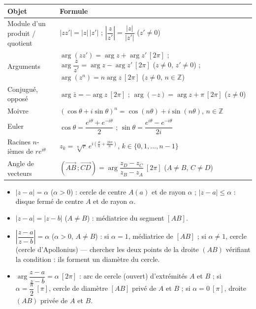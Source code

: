 \documentclass[11pt]{article}
\newcommand{\cle}[1]{{\popxbold\color{popdark}#1}}
\begin{document}
\begin{aretenir}
\begin{center}
\begin{tabularx}{\linewidth}{|l|X|}
\hline
\rowcolor{popblueL} \textbf{Objet} & \textbf{Formule} \\
\hline
Module d'un produit / quotient & $|zz'|=|z|\,|z'|$ ; $\left|\dfrac{z}{z'}\right|=\dfrac{|z|}{|z'|}$ ($z'\neq 0$) \\
\hline
Arguments & $\arg(zz')=\arg z+\arg z'\ [2\pi]$ ; $\arg\dfrac{z}{z'}=\arg z-\arg z'\ [2\pi]$ ($z\neq 0$, $z'\neq 0$) ; $\arg(z^n)=n\arg z\ [2\pi]$ ($z\neq 0$, $n\in\mathbb{Z}$) \\
\hline
Conjugué, opposé & $\arg\bar z=-\arg z\ [2\pi]$ ; $\arg(-z)=\arg z+\pi\ [2\pi]$ ($z\neq 0$) \\
\hline
Moivre & $(\cos\theta+i\sin\theta)^n=\cos(n\theta)+i\sin(n\theta)$, $n\in\mathbb{Z}$ \\
\hline
Euler & $\cos\theta=\dfrac{e^{i\theta}+e^{-i\theta}}{2}$ ; $\sin\theta=\dfrac{e^{i\theta}-e^{-i\theta}}{2i}$ \\
\hline
Racines $n$-ièmes de $re^{i\theta}$ & $z_k=\sqrt[n]{r}\,e^{i\left(\frac{\theta}{n}+\frac{2k\pi}{n}\right)}$, $k\in\{0,1,\dots,n-1\}$ \\
\hline
Angle de vecteurs & $(\overrightarrow{AB}\,;\overrightarrow{CD})=\arg\dfrac{z_D-z_C}{z_B-z_A}\ [2\pi]$ ($A\neq B$, $C\neq D$) \\
\hline
\end{tabularx}
\end{center}
\end{aretenir}

\begin{aretenir}
\begin{itemize}
  \item $|z-a|=\alpha$ ($\alpha>0$) : \cle{cercle} de centre $A(a)$ et de rayon $\alpha$ ; $|z-a|\leq\alpha$ : \cle{disque fermé} de centre $A$ et de rayon $\alpha$.
  \item $|z-a|=|z-b|$ ($A\neq B$) : \cle{médiatrice} du segment $[AB]$.
  \item $\left|\dfrac{z-a}{z-b}\right|=\alpha$ ($\alpha>0$, $A\neq B$) : si $\alpha=1$, médiatrice de $[AB]$ ; si $\alpha\neq 1$, \cle{cercle} (cercle d'Apollonius) — chercher les deux points de la droite $(AB)$ vérifiant la condition : ils forment un diamètre du cercle.
  \item $\arg\dfrac{z-a}{z-b}=\alpha\ [2\pi]$ : \cle{arc de cercle} (ouvert) d'extrémités $A$ et $B$ ; si $\alpha=\dfrac{\pi}{2}\ [\pi]$, cercle de diamètre $[AB]$ privé de $A$ et $B$ ; si $\alpha=0\ [\pi]$, droite $(AB)$ privée de $A$ et $B$.
\end{itemize}
\end{aretenir}
\end{document}
